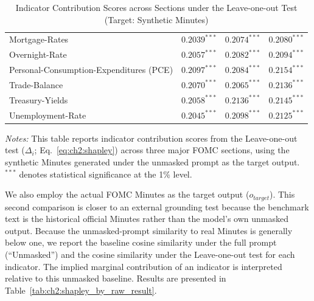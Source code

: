 \begin{table}[htbp]
\begin{threeparttable}
\begin{tabular}{p{3.6cm} p{4.3cm} p{3.1cm} p{3.1cm}}
Mortgage-Rates & $0.2039^{***}$ & $0.2074^{***}$ & $0.2080^{***}$ \\
Overnight-Rate & $0.2057^{***}$ & $0.2082^{***}$ & $0.2094^{***}$ \\
Personal-Consumption-Expenditures (PCE) & $0.2097^{***}$ & $0.2084^{***}$ & $0.2154^{***}$ \\
Trade-Balance & $0.2070^{***}$ & $0.2065^{***}$ & $0.2136^{***}$ \\
Treasury-Yields & $0.2058^{***}$ & $0.2136^{***}$ & $0.2145^{***}$ \\
Unemployment-Rate & $0.2045^{***}$ & $0.2098^{***}$ & $0.2125^{***}$ \\
\bottomrule
\end{tabular}
\begin{tablenotes}[flushleft]
\footnotesize
\item \textit{Notes:} This table reports indicator contribution scores from the Leave-one-out test ($\Delta_i$; Eq.~\ref{eq:ch2:shapley}) across three major FOMC sections, using the synthetic Minutes generated under the unmasked prompt as the target output. 
$^{***}$ denotes statistical significance at the 1\% level.
\end{tablenotes}
\caption{Indicator Contribution Scores across Sections under the Leave-one-out Test (Target: Synthetic Minutes)}
\label{tab:ch2:shapley_result}
\end{threeparttable}
\end{table}


We also employ the actual FOMC Minutes as the target output ($o_{target}$). This second comparison is closer to an external grounding test because the benchmark text is the historical official Minutes rather than the model's own unmasked output. Because the unmasked-prompt similarity to real Minutes is generally below one, we report the baseline cosine similarity under the full prompt (``Unmasked'') and the cosine similarity under the Leave-one-out test for each indicator. The implied marginal contribution of an indicator is interpreted relative to this unmasked baseline. Results are presented in Table~\ref{tab:ch2:shapley_by_raw_result}.

